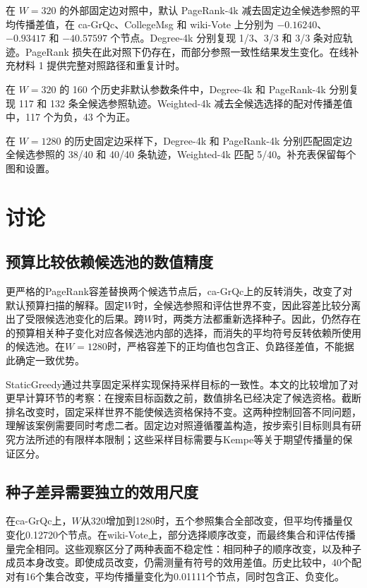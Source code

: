 \documentclass[smallextended]{svjour3}
\begin{document}
在 $W=320$ 的外部固定边对照中，默认 PageRank-4k 减去固定边全候选参照的平均传播差值，在 ca-GrQc、CollegeMsg 和 wiki-Vote 上分别为 $-0.16240$、$-0.93417$ 和 $-40.57597$ 个节点。Degree-4k 分别复现 1/3、3/3 和 3/3 条对应轨迹。PageRank 损失在此对照下仍存在，而部分参照一致性结果发生变化。在线补充材料 1 提供完整对照路径和重复计时。

在 $W=320$ 的 160 个历史非默认参数条件中，Degree-4k 和 PageRank-4k 分别复现 117 和 132 条全候选参照轨迹。Weighted-4k 减去全候选选择的配对传播差值中，117 个为负，43 个为正。

在 $W=1280$ 的历史固定边采样下，Degree-4k 和 PageRank-4k 分别匹配固定边全候选参照的 38/40 和 40/40 条轨迹，Weighted-4k 匹配 5/40。补充表保留每个图和设置。
\FloatBarrier

\section{讨论}
\subsection{预算比较依赖候选池的数值精度}
更严格的PageRank容差替换两个候选节点后，ca-GrQc上的反转消失，改变了对默认预算扫描的解释。固定$W$时，全候选参照和评估世界不变，因此容差比较分离出了受限候选池变化的后果。跨$W$时，两类方法都重新选择种子。因此，仍然存在的预算相关种子变化对应各候选池内部的选择，而消失的平均符号反转依赖所使用的候选池。在$W=1280$时，严格容差下的正均值也包含正、负路径差值，不能据此确定一致优势。

StaticGreedy通过共享固定采样实现保持采样目标的一致性\cite{ref8}。本文的比较增加了对更早计算环节的考察：在搜索目标函数之前，数值排名已经决定了候选资格。截断排名改变时，固定采样世界不能使候选资格保持不变。这两种控制回答不同问题，理解该案例需要同时考虑二者。固定边对照遵循覆盖构造，按步索引目标则具有研究方法所述的有限样本限制；这些采样目标需要与Kempe等关于期望传播量的保证区分\cite{ref1}。

\subsection{种子差异需要独立的效用尺度}
在ca-GrQc上，$W$从320增加到1280时，五个参照集合全部改变，但平均传播量仅变化0.12720个节点。在wiki-Vote上，部分选择顺序改变，而最终集合和评估传播量完全相同。这些观察区分了两种表面不稳定性：相同种子的顺序改变，以及种子成员本身改变。即使成员改变，仍需测量有符号的效用差值。历史比较中，40个配对有16个集合改变，平均传播量变化为0.01111个节点，同时包含正、负变化。
\end{document}

